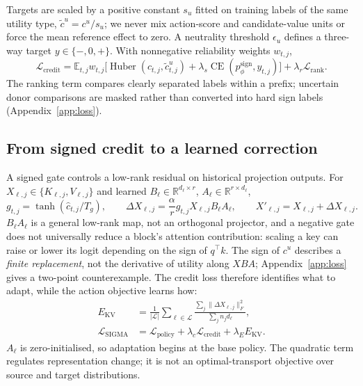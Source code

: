 \documentclass{article}
\newcommand{\E}{\mathbb{E}}
\newcommand{\R}{\mathbb{R}}
\begin{document}
Targets are scaled by a positive constant $s_u$ fitted on training labels of the
same utility type, $\tilde c^u=c^u/s_u$; we never mix action-score and
candidate-value units or force the mean reference effect to zero. A neutrality
threshold $\epsilon_u$ defines a three-way target $y\in\{-,0,+\}$. With
nonnegative reliability weights $w_{t,j}$,
\begin{equation}
 \mathcal L_{\mathrm{credit}}=\E_{t,j}w_{t,j}
 \big[\operatorname{Huber}(\hat c_{t,j},\tilde c^u_{t,j})
       +\lambda_s\operatorname{CE}(p_\phi^{\mathrm{sign}},y_{t,j})\big]
       +\lambda_r\mathcal L_{\mathrm{rank}}.
 \label{eq:credit-loss}
\end{equation}
The ranking term compares clearly separated labels within a prefix; uncertain
donor comparisons are masked rather than converted into hard sign labels
(Appendix~\ref{app:loss}).

\subsection{From signed credit to a learned correction}
\label{sec:adapt}

A signed gate controls a low-rank residual on historical projection outputs. For
$X_{\ell,j}\in\{K_{\ell,j},V_{\ell,j}\}$ and learned $B_\ell\in\R^{d_\ell\times r}$,
$A_\ell\in\R^{r\times d_\ell}$,
\begin{equation}
 g_{t,j}=\tanh(\hat c_{t,j}/T_g),\qquad
 \Delta X_{\ell,j}=\frac{\alpha}{r}g_{t,j}X_{\ell,j}B_\ell A_\ell,
 \qquad X'_{\ell,j}=X_{\ell,j}+\Delta X_{\ell,j}.
 \label{eq:adapt}
\end{equation}
$B_\ell A_\ell$ is a general low-rank map, not an orthogonal projector, and a
negative gate does not universally reduce a block's attention contribution:
scaling a key can raise or lower its logit depending on the sign of
$q^\top k$. The sign of $c^u$ describes a \emph{finite replacement}, not the
derivative of utility along $XBA$; Appendix~\ref{app:loss} gives a two-point
counterexample. The credit loss therefore identifies what to adapt, while the
action objective learns how:
\begin{align}
 E_{\mathrm{KV}}&=\frac{1}{|\mathcal L|}\sum_{\ell\in\mathcal L}
   \frac{\sum_j\|\Delta X_{\ell,j}\|_F^2}{\sum_j n_jd_\ell},\label{eq:energy}\\
 \mathcal L_{\mathrm{SIGMA}}&=\mathcal L_{\mathrm{policy}}
       +\lambda_c\mathcal L_{\mathrm{credit}}+\lambda_E E_{\mathrm{KV}}.
 \label{eq:total}
\end{align}
$A_\ell$ is zero-initialised, so adaptation begins at the base policy. The
quadratic term regulates representation change; it is not an optimal-transport
objective over source and target distributions.
\end{document}

